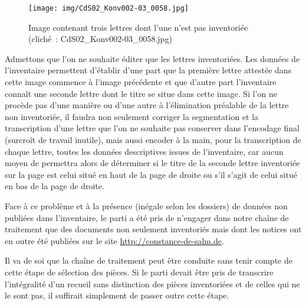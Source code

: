 \documentclass[a4paper,12pt,twoside]{book}
\begin{document}
				\begin{figure}[!h]
					\centering
					\texttt{[image: img/CdS02\_Konv002-03\_0058.jpg]}
					\caption{Image contenant trois lettres dont l'une n'est pas inventoriée (cliché~: CdS02\_Konv002-03\_0058.jpg)}
					\label{non-invent-58}
				\end{figure}
				
				Admettons que l'on ne souhaite éditer que les lettres inventoriées. Les données de l'inventaire permettent d'établir d'une part que la première lettre attestée dans cette image commence à l'image précédente et que d'autre part l'inventaire connaît une seconde lettre dont le titre se situe dans cette image. Si l'on ne procède pas d'une manière ou d'une autre à l'élimination préalable de la lettre non inventoriée, il faudra non seulement corriger la {segmentation} et la transcription d'une lettre que l'on ne souhaite pas conserver dans l'encodage final (surcroît de travail inutile), mais aussi encoder à la main, pour la transcription de chaque lettre, toutes les données descriptives issues de l'inventaire, car aucun moyen de permettra alors de déterminer si le titre de la seconde lettre inventoriée sur la page est celui situé en haut de la page de droite ou s'il s'agit de celui situé en bas de la page de droite.
						
				Face à ce problème et à la présence (inégale selon les dossiers) de données non publiées dans l'inventaire, le parti a été pris de n'engager dans notre chaîne de traitement que des documents non seulement inventoriés mais dont les notices ont en outre été publiées sur le site \url{http://constance-de-salm.de}.
				
				Il va de soi que la chaîne de traitement peut être conduite sans tenir compte de cette étape de sélection des pièces. Si le parti devait être pris de transcrire l'intégralité d'un recueil sans distinction des pièces inventoriées et de celles qui ne le sont pas, il suffirait simplement de passer outre cette étape.
				
\end{document}
